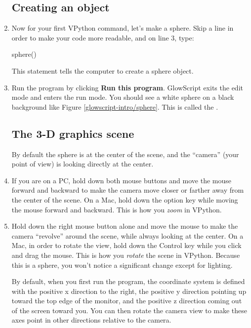 \begin{enumerate}
	\subsection*{Creating an object}

	\item Now for your first VPython command, let's make a sphere. Skip a line in order to make your code more readable, and on line 3, type:

\begin{myvpython}
sphere()
\end{myvpython}

This statement tells the computer to create a sphere object.

	\item Run the program by clicking {\bf Run this program}. GlowScript exits the edit mode and enters the run mode. You should see a white sphere on a black background like Figure \ref{glowscript-intro/sphere}. This is called the .



	\subsection*{The 3-D graphics scene}
	
By default the sphere is at the center of the scene, and the ``camera'' (your point of view) is looking directly at the center.
	
	\item If you are on a PC, hold down both mouse buttons and move the mouse forward and backward to make the camera move closer or farther away from the center of the scene. On a Mac, hold down the option key while moving the mouse forward and backward. This is how you \emph{zoom} in VPython.
	
	\item Hold down the right mouse button alone and move the mouse to make the camera ``revolve'' around the scene, while always looking at the center. On a Mac, in order to rotate the view, hold down the Control key while you click and drag the mouse. This is how you \emph{rotate} the scene in VPython. Because this is a sphere, you won't notice a significant change except for lighting.

By default, when you first run the program, the coordinate system is defined with the positive x direction to the right, the positive y direction pointing up toward the top edge of the monitor, and the positive z direction coming out of the screen toward you. You can then rotate the camera view to make these axes point in other directions relative to the camera. 
		

\end{enumerate}
